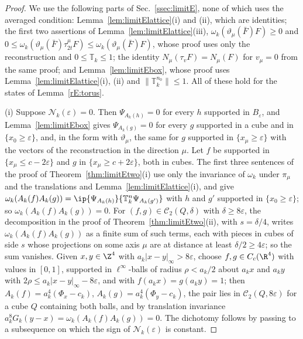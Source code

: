 \begin{proof}
We use the following parts of Sec.~\ref{ssec:limitE}, none of which uses
the averaged condition: Lemma~\ref{lem:limitElattice}(i) and (ii), which are
identities; the first two assertions of Lemma~\ref{lem:limitElattice}(iii),
$\omega_k(\vartheta_\mu(\bar F)F)\ge0$ and $0\le\omega_k(\vartheta_\mu(\bar
F)\tau^\mu_{2t}F)\le\omega_k(\vartheta_\mu(\bar F)F)$, whose proof uses only
the reconstruction and $0\le\mathbb T_k\le1$; the identity
$N_\mu(\tau_vF)=N_\mu(F)$ for $v_\mu=0$ from the same proof; and
Lemma~\ref{lem:limitEbox}, whose proof uses Lemma~\ref{lem:limitElattice}(i),
(ii) and $\|\mathbb T_k^{n_0}\|\le1$. All of these hold for the states of
Lemma~\ref{rE:torus}.

(i) Suppose $\mathcal N_k(\varepsilon)=0$. Then $\Psi_{A_k(h)}=0$ for every
$h$ supported in $B_\varepsilon$, and Lemma~\ref{lem:limitEbox} gives
$\Psi_{A_k(g)}=0$ for every $g$ supported in a cube and in
$\{x_0\ge\varepsilon\}$, and, in the form with $\vartheta_\mu$, the same for
$g$ supported in $\{x_\mu\ge\varepsilon\}$ with the vectors of the
reconstruction in the direction $\mu$. Let $f$ be supported in $\{x_\mu\le
c-2\varepsilon\}$ and $g$ in $\{x_\mu\ge c+2\varepsilon\}$, both in cubes. The
first three sentences of the proof of Theorem~\ref{thm:limitEtwo}(i) use only
the invariance of $\omega_k$ under $\pi_\mu$ and the translations and
Lemma~\ref{lem:limitElattice}(i), and give $\omega_k(A_k(f)A_k(g))=
\ip{\Psi_{A_k(h)}}{\mathbb T_k^n\Psi_{A_k(g')}}$ with $h$ and $g'$ supported
in $\{x_0\ge\varepsilon\}$; so $\omega_k(A_k(f)A_k(g))=0$. For $(f,g)\in
\mathcal C_2(Q,\delta)$ with $\delta\ge8\varepsilon$, the decomposition in
the proof of Theorem~\ref{thm:limitEtwo}(ii), with $s=\delta/4$, writes
$\omega_k(A_k(f)A_k(g))$ as a finite sum of such terms, each with pieces in
cubes of side $s$ whose projections on some axis $\mu$ are at distance at
least $\delta/2\ge4\varepsilon$; so the sum vanishes. Given $x,y\in\Z^4$ with
$a_k|x-y|_\infty>8\varepsilon$, choose $f,g\in C_c(\R^4)$ with values in
$[0,1]$, supported in $\ell^\infty$-balls of radius $\rho<a_k/2$ about
$a_kx$ and $a_ky$ with $2\rho\le a_k|x-y|_\infty-8\varepsilon$, and with
$f(a_kx)=g(a_ky)=1$; then $A_k(f)=a_k^4(\Phi_x-c_k)$,
$A_k(g)=a_k^4(\Phi_y-c_k)$, the pair lies in $\mathcal C_2(Q,8\varepsilon)$
for a cube $Q$ containing both balls, and by translation invariance
$a_k^8G_k(y-x)=\omega_k(A_k(f)A_k(g))=0$. The dichotomy follows by passing
to a subsequence on which the sign of $\mathcal N_k(\varepsilon)$ is
constant.


\end{proof}
